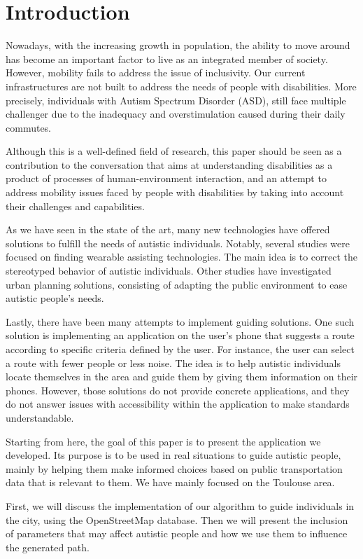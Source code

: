 \section{Introduction}

Nowadays, with the increasing growth in population, the ability to move around has become an important factor to live as an integrated member of society. However, mobility fails to address the issue of inclusivity. Our current infrastructures are not built to address the needs of people with disabilities. More precisely, individuals with Autism Spectrum Disorder (ASD), still face multiple challenger due to the inadequacy and overstimulation caused during their daily commutes.

Although this is a well-defined field of research, this paper should be seen as a contribution to the conversation that aims at understanding disabilities as a product of processes of human-environment interaction, and an attempt to address mobility issues faced by people with disabilities by taking into account their challenges and capabilities.

As we have seen in the state of the art, many new technologies have offered solutions to fulfill the needs of autistic individuals. Notably, several studies were focused on finding wearable assisting technologies. The main idea is to correct the stereotyped behavior of autistic individuals. Other studies have investigated urban planning solutions, consisting of adapting the public environment to ease autistic people's needs.

Lastly, there have been many attempts to implement guiding solutions. One such solution is implementing an application on the user’s phone that suggests a route according to specific criteria defined by the user. For instance, the user can select a route with fewer people or less noise. The idea is to help autistic individuals locate themselves in the area and guide them by giving them information on their phones. However, those solutions do not provide concrete applications, and they do not answer issues with accessibility within the application to make standards understandable.

Starting from here, the goal of this paper is to present the application we developed. Its purpose is to be used in real situations to guide autistic people, mainly by helping them make informed choices based on public transportation data that is relevant to them. We have mainly focused on the Toulouse area.

First, we will discuss the implementation of our algorithm to guide individuals in the city, using the OpenStreetMap database. Then we will present the inclusion of parameters that may affect autistic people and how we use them to influence the generated path.

